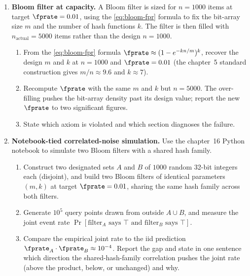 \begin{enumerate}
\item \exstar
\label{ex:ch16-3}
\textbf{Bloom filter at capacity.}
A Bloom filter is sized for $n = 1000$ items at target $\fprate =
0.01$, using the \eqref{eq:bloom-fpr} formula to fix the bit-array
size $m$ and the number of hash functions $k$. The filter is then
filled with $n_{\text{actual}} = 5000$ items rather than the design
$n = 1000$.
\begin{enumerate}
  \item[(a)] From the \eqref{eq:bloom-fpr} formula $\fprate \approx
    (1 - e^{-k n / m})^k$, recover the design $m$ and $k$ at $n =
    1000$ and $\fprate = 0.01$ (the chapter~5 standard
    construction gives $m / n \approx 9.6$ and $k \approx 7$).
  \item[(b)] Recompute $\fprate$ with the same $m$ and $k$ but
    $n = 5000$. The over-filling pushes the bit-array density past
    its design value; report the new $\fprate$ to two significant
    figures.
  \item[(c)] State which axiom is violated and which section
    diagnoses the failure.
\end{enumerate}


\item \exstarstar
\label{ex:ch16-4}
\textbf{Notebook-tied correlated-noise simulation.}
Use the chapter~16 Python notebook to simulate two Bloom filters
with a shared hash family.
\begin{enumerate}
  \item[(a)] Construct two designated sets $A$ and $B$ of $1000$
    random 32-bit integers each (disjoint), and build two Bloom
    filters of identical parameters $(m, k)$ at target $\fprate =
    0.01$, sharing the same hash family across both filters.
  \item[(b)] Generate $10^5$ query points drawn from outside $A
    \cup B$, and measure the joint event rate $\Pr[\text{filter}_A
    \text{ says } \top \text{ and filter}_B \text{ says } \top]$.
  \item[(c)] Compare the empirical joint rate to the iid prediction
    $\fprate_A \cdot \fprate_B \approx 10^{-4}$. Report the gap and
    state in one sentence which direction the shared-hash-family
    correlation pushes the joint rate (above the product, below,
    or unchanged) and why.
\end{enumerate}


\end{enumerate}
